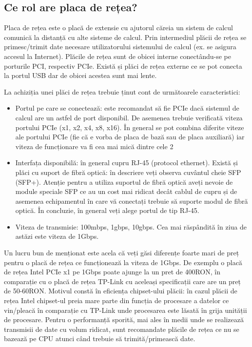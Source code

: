 
\subsection{Ce rol are placa de rețea?}
\label{sec:hardware-extensii-net}

Placa de rețea este o placă de extensie cu ajutorul căreia un sistem de calcul
comunică la distanță cu alte sisteme de calcul. Prin intermediul plăcii de rețea
se primesc/trimit date necesare utilizatorului sistemului de calcul (ex. se
asigura accesul la Internet). Plăcile de rețea sunt de obicei interne
conectându-se pe porturile PCI, respectiv PCIe. Există și plăci de rețea externe
ce se pot conecta la portul USB dar de obicei acestea sunt mai lente.

La achiziția unei plăci de rețea trebuie ținut cont de următoarele caracteristici:

\begin{itemize}
	\item Portul pe care se conectează: este recomandat să fie PCIe dacă
		sistemul de calcul are un astfel de port disponibil. De asemenea
		trebuie verificată viteza portului PCIe (x1, x2, x4, x8, x16).
		În general se pot combina diferite viteze ale portului PCIe (fie
		că e vorba de placa de bază sau de placa auxiliară) iar viteza
		de funcționare va fi cea mai mică dintre cele 2
	\item Interfața disponibilă: în general cupru RJ-45 (protocol ethernet).
		Există și plăci cu suport de fibră optică: în descriere veți
		observa cuvântul cheie SFP  (SFP+). Atenție pentru a utiliza suportul
		de fibră optică aveți nevoie de module speciale SFP ce au un
		cost mai ridicat decât cablul de cupru și de asemenea
		echipamentul în care vă conectați trebuie să suporte modul de
		fibră optică. În concluzie, în general veți alege portul de tip
		RJ-45.
	\item Viteza de transmisie: 100mbps, 1gbps, 10gbps. Cea mai răspândită
		în ziua de astăzi este viteza de 1Gbps.
\end{itemize}


Un lucru bun de menționat este acela că veți găsi diferențe foarte mari de preț
pentru o placă de rețea ce funcționează la viteza de 1Gbps. De exemplu o placă
de rețea Intel PCIe x1 pe 1Gbps poate ajunge la un pret de 400RON, în comparație
cu o placă de rețea TP-Link cu aceleași specificații care are un preț de
50-60RON. Motivul constă în eficiența chipset-ului plăcii: în cazul plăcii de
rețea Intel chipset-ul preia mare parte din funcția de procesare a datelor ce
vin/pleacă în comparație cu TP-Link unde procesarea este lăsată în grija
unității de procesare. Pentru o performanță sporită, mai ales în medii unde se
realizează transmisii de date cu volum ridicat, sunt recomandate plăcile de
rețea ce nu se bazează pe CPU atunci când trebuie să trimită/primească date.

